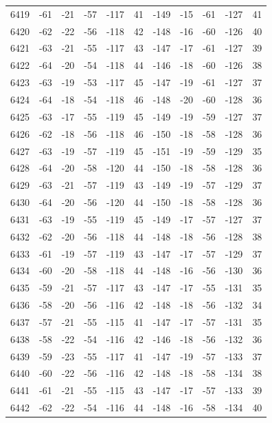 \begin{table}[H]
\begin{tabular}{lllllllllll}
6419 & -61 & -21 & -57 & -117 & 41 & -149 & -15 & -61 & -127 & 41 \\
6420 & -62 & -22 & -56 & -118 & 42 & -148 & -16 & -60 & -126 & 40 \\
6421 & -63 & -21 & -55 & -117 & 43 & -147 & -17 & -61 & -127 & 39 \\
6422 & -64 & -20 & -54 & -118 & 44 & -146 & -18 & -60 & -126 & 38 \\
6423 & -63 & -19 & -53 & -117 & 45 & -147 & -19 & -61 & -127 & 37 \\
6424 & -64 & -18 & -54 & -118 & 46 & -148 & -20 & -60 & -128 & 36 \\
6425 & -63 & -17 & -55 & -119 & 45 & -149 & -19 & -59 & -127 & 37 \\
6426 & -62 & -18 & -56 & -118 & 46 & -150 & -18 & -58 & -128 & 36 \\
6427 & -63 & -19 & -57 & -119 & 45 & -151 & -19 & -59 & -129 & 35 \\
6428 & -64 & -20 & -58 & -120 & 44 & -150 & -18 & -58 & -128 & 36 \\
6429 & -63 & -21 & -57 & -119 & 43 & -149 & -19 & -57 & -129 & 37 \\
6430 & -64 & -20 & -56 & -120 & 44 & -150 & -18 & -58 & -128 & 36 \\
6431 & -63 & -19 & -55 & -119 & 45 & -149 & -17 & -57 & -127 & 37 \\
6432 & -62 & -20 & -56 & -118 & 44 & -148 & -18 & -56 & -128 & 38 \\
6433 & -61 & -19 & -57 & -119 & 43 & -147 & -17 & -57 & -129 & 37 \\
6434 & -60 & -20 & -58 & -118 & 44 & -148 & -16 & -56 & -130 & 36 \\
6435 & -59 & -21 & -57 & -117 & 43 & -147 & -17 & -55 & -131 & 35 \\
6436 & -58 & -20 & -56 & -116 & 42 & -148 & -18 & -56 & -132 & 34 \\
6437 & -57 & -21 & -55 & -115 & 41 & -147 & -17 & -57 & -131 & 35 \\
6438 & -58 & -22 & -54 & -116 & 42 & -146 & -18 & -56 & -132 & 36 \\
6439 & -59 & -23 & -55 & -117 & 41 & -147 & -19 & -57 & -133 & 37 \\
6440 & -60 & -22 & -56 & -116 & 42 & -148 & -18 & -58 & -134 & 38 \\
6441 & -61 & -21 & -55 & -115 & 43 & -147 & -17 & -57 & -133 & 39 \\
6442 & -62 & -22 & -54 & -116 & 44 & -148 & -16 & -58 & -134 & 40 \\

\end{tabular}
\end{table}
